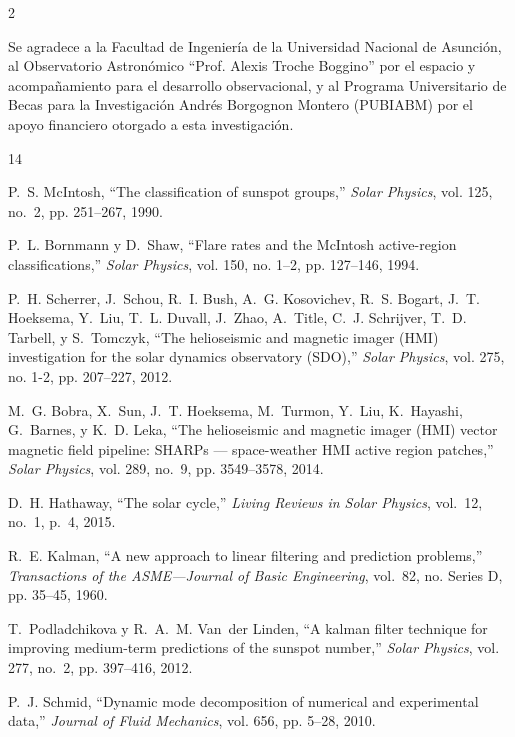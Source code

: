 \documentclass[final]{article}
\newcommand{\sectiontitle}[1]{\vspace{4.2mm}{\color{sectionred}\bfseries\fontsize{21}{24}\selectfont #1}\par\vspace{0.8mm}{\color{sectionred}\rule{\linewidth}{1.0pt}}\par\vspace{1.4mm}}
\begin{document}
{\begin{multicols}{2}
\sectiontitle{AGRADECIMIENTOS}
Se agradece a la Facultad de Ingeniería de la Universidad Nacional de Asunción, al Observatorio Astronómico ``Prof. Alexis Troche Boggino'' por el espacio y acompañamiento para el desarrollo observacional, y al Programa Universitario de Becas para la Investigación Andrés Borgognon Montero (PUBIABM) por el apoyo financiero otorgado a esta investigación.

\sectiontitle{REFERENCIAS}
{\fontsize{8.7}{9.8}\selectfont
\begin{thebibliography}{14}

P.~S. McIntosh, ``The classification of sunspot groups,'' \emph{Solar Physics}, vol. 125, no.~2, pp. 251--267, 1990.

P.~L. Bornmann y D.~Shaw, ``Flare rates and the {McIntosh} active-region classifications,'' \emph{Solar Physics}, vol. 150, no. 1--2, pp. 127--146, 1994.

P.~H. Scherrer, J.~Schou, R.~I. Bush, A.~G. Kosovichev, R.~S. Bogart, J.~T. Hoeksema, Y.~Liu, T.~L. Duvall, J.~Zhao, A.~Title, C.~J. Schrijver, T.~D. Tarbell, y S.~Tomczyk, ``The helioseismic and magnetic imager ({HMI}) investigation for the solar dynamics observatory ({SDO}),'' \emph{Solar Physics}, vol. 275, no. 1-2, pp. 207--227, 2012.

M.~G. Bobra, X.~Sun, J.~T. Hoeksema, M.~Turmon, Y.~Liu, K.~Hayashi, G.~Barnes, y K.~D. Leka, ``The helioseismic and magnetic imager ({HMI}) vector magnetic field pipeline: {SHARPs} --- space-weather {HMI} active region patches,'' \emph{Solar Physics}, vol. 289, no.~9, pp. 3549--3578, 2014.

D.~H. Hathaway, ``The solar cycle,'' \emph{Living Reviews in Solar Physics}, vol.~12, no.~1, p.~4, 2015.

R.~E. Kalman, ``A new approach to linear filtering and prediction problems,'' \emph{Transactions of the ASME---Journal of Basic Engineering}, vol.~82, no. Series D, pp. 35--45, 1960.

T.~Podladchikova y R.~A.~M. Van~der Linden, ``A kalman filter technique for improving medium-term predictions of the sunspot number,'' \emph{Solar Physics}, vol. 277, no.~2, pp. 397--416, 2012.

P.~J. Schmid, ``Dynamic mode decomposition of numerical and experimental data,'' \emph{Journal of Fluid Mechanics}, vol. 656, pp. 5--28, 2010.


\end{thebibliography}}
\end{multicols}}
\end{document}
